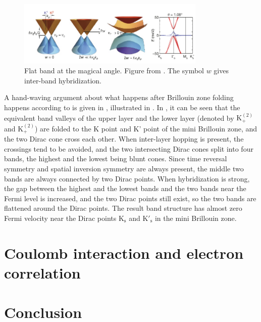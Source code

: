 \documentclass[hyperref, a4paper]{article}
\begin{document}
\begin{figure}
    \centering
    \includegraphics[width=0.8\textwidth]{plot/yuan-cao-band.pdf}
    \caption{Flat band at the magical angle. Figure from \cite{cao_correlated_2018}.
    The symbol $w$ gives inter-band hybridization.}
    \label{fig:flat-band-generation}
\end{figure}

A hand-waving argument about what happens after Brillouin zone folding happens according to 
is given in \cite{cao_correlated_2018},
illustrated in .
In , it can be seen that 
the equivalent band valleys of the upper layer and the lower layer 
(denoted by $\mathrm{K}^{(2)}_+$ and $\mathrm{K}^{(2)}_+$)
are folded to the K point and K' point of the mini Brillouin zone,
and the two Dirac cone cross each other.
When inter-layer hopping is present,
the crossings tend to be avoided,
and the two intersecting Dirac cones split into four bands,
the highest and the lowest being blunt cones.
Since time reversal symmetry and spatial inversion symmetry are always present,
the middle two bands are always connected by two Dirac points.
When hybridization is strong, the gap between the highest and the lowest bands 
and the two bands near the Fermi level is increased,
and the two Dirac points still exist,
so the two bands are flattened around the Dirac points.
The result band structure has almost zero Fermi velocity near the Dirac points 
$\mathrm{K}_{\text{s}}$  and $\mathrm{K}'_{\text{s}}$ in the mini Brillouin zone.

\section{Coulomb interaction and electron correlation}

\section{Conclusion}



\end{document}
